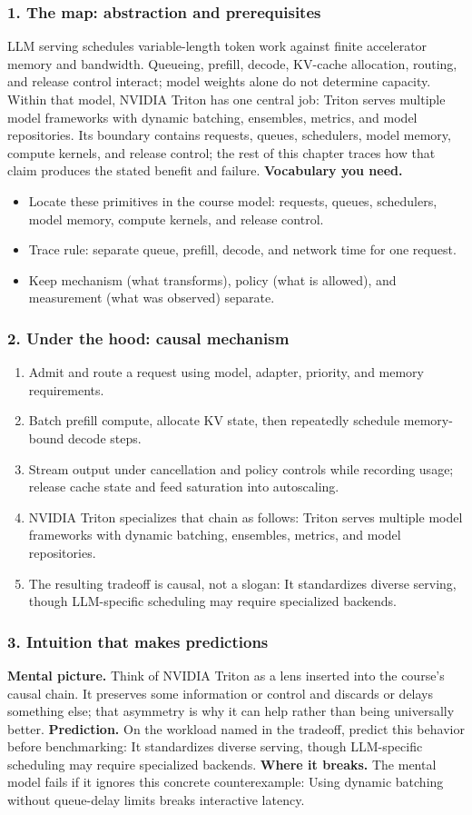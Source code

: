 \subsubsection*{1. The map: abstraction and prerequisites}
LLM serving schedules variable-length token work against finite accelerator memory and bandwidth. Queueing, prefill, decode, KV-cache allocation, routing, and release control interact; model weights alone do not determine capacity.
Within that model, NVIDIA Triton has one central job: Triton serves multiple model frameworks with dynamic batching, ensembles, metrics, and model repositories. Its boundary contains requests, queues, schedulers, model memory, compute kernels, and release control; the rest of this chapter traces how that claim produces the stated benefit and failure.
\textbf{Vocabulary you need.}\begin{itemize}
\item Locate these primitives in the course model: requests, queues, schedulers, model memory, compute kernels, and release control.
\item Trace rule: separate queue, prefill, decode, and network time for one request.
\item Keep mechanism (what transforms), policy (what is allowed), and measurement (what was observed) separate.
\end{itemize}
\subsubsection*{2. Under the hood: causal mechanism}\begin{enumerate}
\item Admit and route a request using model, adapter, priority, and memory requirements.
\item Batch prefill compute, allocate KV state, then repeatedly schedule memory-bound decode steps.
\item Stream output under cancellation and policy controls while recording usage; release cache state and feed saturation into autoscaling.
\item NVIDIA Triton specializes that chain as follows: Triton serves multiple model frameworks with dynamic batching, ensembles, metrics, and model repositories.
\item The resulting tradeoff is causal, not a slogan: It standardizes diverse serving, though LLM-specific scheduling may require specialized backends.
\end{enumerate}
\subsubsection*{3. Intuition that makes predictions}
\textbf{Mental picture.} Think of NVIDIA Triton as a lens inserted into the course's causal chain. It preserves some information or control and discards or delays something else; that asymmetry is why it can help rather than being universally better.
\textbf{Prediction.} On the workload named in the tradeoff, predict this behavior before benchmarking: It standardizes diverse serving, though LLM-specific scheduling may require specialized backends.
\textbf{Where it breaks.} The mental model fails if it ignores this concrete counterexample: Using dynamic batching without queue-delay limits breaks interactive latency.
